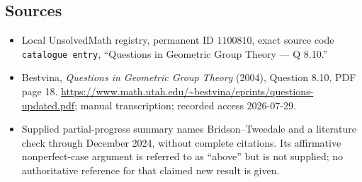 \documentclass[11pt]{article}
\begin{document}
\subsection{Sources}
\begin{itemize}
\item Local UnsolvedMath registry, permanent ID \(1100810\), exact source code \texttt{catalogue entry}, ``Questions in Geometric Group Theory --- Q 8.10.''
\item Bestvina, \emph{Questions in Geometric Group Theory} (2004), Question 8.10, PDF page 18. \url{https://www.math.utah.edu/~bestvina/eprints/questions-updated.pdf}; manual transcription; recorded access 2026-07-29.
\item Supplied partial-progress summary names Bridson--Tweedale and a literature check through December 2024, without complete citations. Its affirmative nonperfect-case argument is referred to as ``above'' but is not supplied; no authoritative reference for that claimed new result is given.
\end{itemize}
\end{document}
